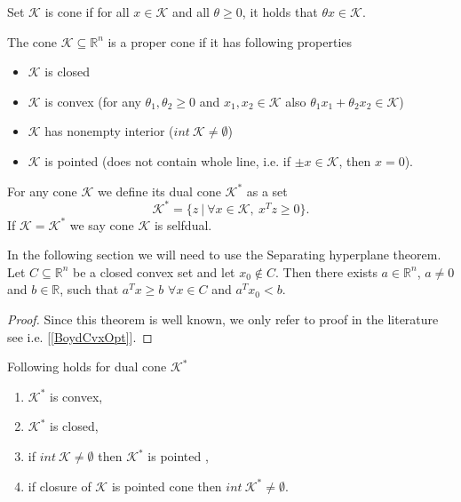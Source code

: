 \documentclass[12pt]{book}
\theoremstyle{definition}
\begin{document}
\begin{appendix}
\label{defCone}
Set $\mathcal{K}$ is cone if for all $x\in \mathcal{K}$ and all $\theta\geq 0$, it holds that $\theta x \in \mathcal{K}$.



\label{defProperCone}
The cone $\mathcal{K}\subseteq \mathbb{R}^n$ is a proper cone if it has following properties
\begin{itemize}
\item $\mathcal{K}$ is closed
\item $\mathcal{K}$ is convex (for any $\theta_1,\theta_2\geq 0$ and $x_1,x_2\in\mathcal{K}$ also $\theta_1x_1 + \theta_2x_2 \in\mathcal{K}$)
\item $\mathcal{K}$ has nonempty interior  ($int \ \mathcal{K} \neq \emptyset$)
\item $\mathcal{K}$ is pointed (does not contain whole line, i.e. if $\pm x\in \mathcal{K}$, then $x=0$).
\end{itemize}

\label{defDualCone}
For any cone $\mathcal{K}$ we define its dual cone $\mathcal{K}^*$ as a set
\begin{equation}
\mathcal{K}^* = \{z\ |\ \forall x\in\mathcal{K}, \ x^Tz\geq 0\}.
\end{equation}
If  $\mathcal{K} =  \mathcal{K}^*$ we say cone $\mathcal{K}$ is selfdual.



In the following section we will need to use the Separating hyperplane theorem.
\label{SeparatingHyperplaneThm}
Let $C\subseteq \mathbb{R}^n$ be a closed convex set and let $x_0\notin C$. 
Then there exists $a \in \mathbb{R}^n$, $a\neq 0$ and $b\in \mathbb{R}$, such that 
$a^Tx\geq b$ $\forall x\in C$ and $a^Tx_0<b$.
\begin{proof}
Since this theorem is well known, we only refer to proof in the literature see i.e. [\ref{BoydCvxOpt}]. 
\end{proof}

\prop[{[\ref{PokornaSOCPDipl}]}] \label{DualConePropertiesProp}
Following holds for dual cone $\mathcal{K}^*$
\begin{enumerate}
\item  $\mathcal{K}^*$ is convex,
\item  $\mathcal{K}^*$ is closed,
\item if $int \ \mathcal{K}\neq \emptyset$ then $\mathcal{K}^*$ is pointed ,
\item if closure of $\mathcal{K}$ is pointed cone then $int \ \mathcal{K}^*\neq \emptyset$.
\end{enumerate}


\end{appendix}
\end{document}
